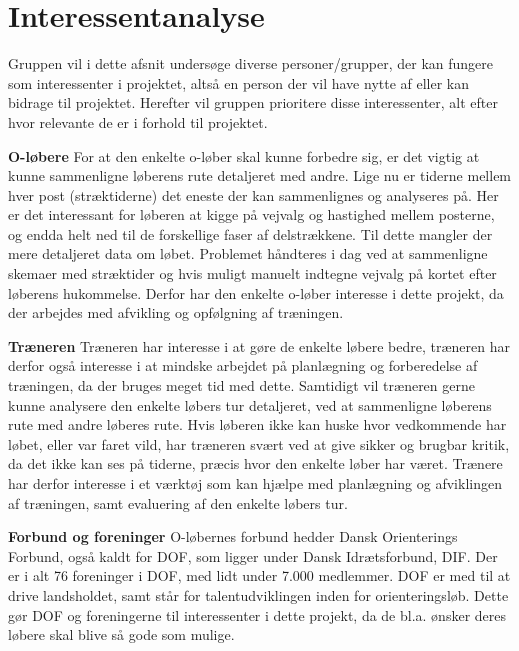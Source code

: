 \section{Interessentanalyse}
Gruppen vil i dette afsnit undersøge diverse personer/grupper, der kan fungere som interessenter i projektet, altså en person der vil have nytte af eller kan bidrage til projektet. Herefter vil gruppen prioritere disse interessenter, alt efter hvor relevante de er i forhold til projektet.  

\textbf{O-løbere} \newline
For at den enkelte o-løber skal kunne forbedre sig, er det vigtig at kunne sammenligne løberens rute detaljeret med andre. Lige nu er tiderne mellem hver post (stræktiderne) det eneste der kan sammenlignes og analyseres på. Her er det interessant for løberen at kigge på vejvalg og hastighed mellem posterne, og endda helt ned til de forskellige faser af delstrækkene. Til dette mangler der mere detaljeret data om løbet. Problemet håndteres i dag ved at sammenligne skemaer med stræktider og hvis muligt manuelt indtegne vejvalg på kortet efter løberens hukommelse. Derfor har den enkelte o-løber interesse i dette projekt, da der arbejdes med afvikling og opfølgning af træningen. 

\textbf{Træneren}\newline
Træneren har interesse i at gøre de enkelte løbere bedre, træneren har derfor også interesse i at mindske arbejdet på planlægning og forberedelse af træningen, da der bruges meget tid med dette. Samtidigt vil træneren gerne kunne analysere den enkelte løbers tur detaljeret, ved at sammenligne løberens rute med andre løberes rute. Hvis løberen ikke kan huske hvor vedkommende har løbet, eller var faret vild, har træneren svært ved at give sikker og brugbar kritik, da det ikke kan ses på tiderne, præcis hvor den enkelte løber har været. Trænere har derfor interesse i et værktøj som kan hjælpe med planlægning og afviklingen af træningen, samt evaluering af den enkelte løbers tur.

\textbf{Forbund og foreninger} \newline
O-løbernes forbund hedder Dansk Orienterings Forbund, også kaldt for DOF, som ligger under Dansk Idrætsforbund, DIF. Der er i alt 76 foreninger i DOF, med lidt under 7.000 medlemmer\citep{DIF}. DOF er med til at drive landsholdet, samt står for talentudviklingen inden for orienteringsløb. Dette gør DOF og foreningerne til interessenter i dette projekt, da de bl.a. ønsker deres løbere skal blive så gode som mulige.\citep{DIF}


